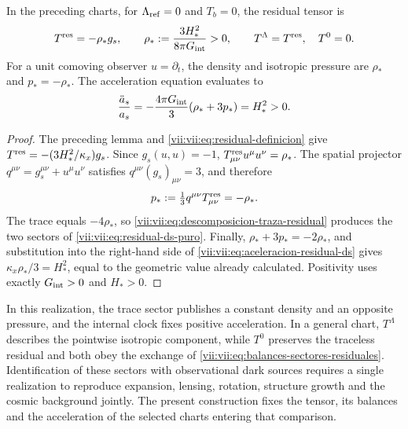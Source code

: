 \begin{theorem}
\label{vii:vii:thm:residual-ds-aceleracion}
In the preceding charts, for \(\Lambda_{\rm ref}=0\) and \(T_b=0\),
the residual tensor is
\begin{equation}
 T^{\rm res}=-\rho_*g_s,\qquad
 \rho_*:=\frac{3H_*^2}{8\pi G_{\rm int}}>0,
 \qquad T^\Lambda=T^{\rm res},\quad T^0=0.
 \label{vii:vii:eq:residual-ds-puro}
\end{equation}
For a unit comoving observer \(u=\partial_t\), the density and
isotropic pressure are \(\rho_*\) and \(p_*=-\rho_*\).
The acceleration equation evaluates to
\begin{equation}
 \frac{\ddot a_s}{a_s}
 =-\frac{4\pi G_{\rm int}}3(\rho_*+3p_*)=H_*^2>0.
 \label{vii:vii:eq:aceleracion-residual-ds}
\end{equation}
\end{theorem}
\begin{proof}
The preceding lemma and \eqref{vii:vii:eq:residual-definicion} give
\(T^{\rm res}=-(3H_*^2/\kappa_x)g_s\).
Since \(g_s(u,u)=-1\),
\(T^{\rm res}_{\mu\nu}u^\mu u^\nu=\rho_*\).
The spatial projector \(q^{\mu\nu}=g_s^{\mu\nu}+u^\mu u^\nu\)
satisfies \(q^{\mu\nu}(g_s)_{\mu\nu}=3\), and therefore
\[
 p_*:=\tfrac13q^{\mu\nu}T^{\rm res}_{\mu\nu}=-\rho_*.
\]
The trace equals \(-4\rho_*\), so
\eqref{vii:vii:eq:descomposicion-traza-residual} produces the two sectors
of \eqref{vii:vii:eq:residual-ds-puro}. Finally,
\(\rho_*+3p_*=-2\rho_*\), and substitution into the right-hand side
of \eqref{vii:vii:eq:aceleracion-residual-ds} gives
\(\kappa_x\rho_*/3=H_*^2\), equal to the geometric value already calculated.
Positivity uses exactly \(G_{\rm int}>0\) and \(H_*>0\).
\end{proof}

In this realization, the trace sector publishes a constant density
and an opposite pressure, and the internal clock fixes positive acceleration.
In a general chart, \(T^\Lambda\) describes the pointwise isotropic
component, while \(T^0\) preserves the traceless residual and both
obey the exchange of \eqref{vii:vii:eq:balances-sectores-residuales}.
Identification of these sectors with observational dark sources
requires a single realization to reproduce expansion,
lensing, rotation, structure growth and the cosmic background jointly. The
present construction fixes the tensor, its balances and the acceleration of
the selected charts entering that comparison.
